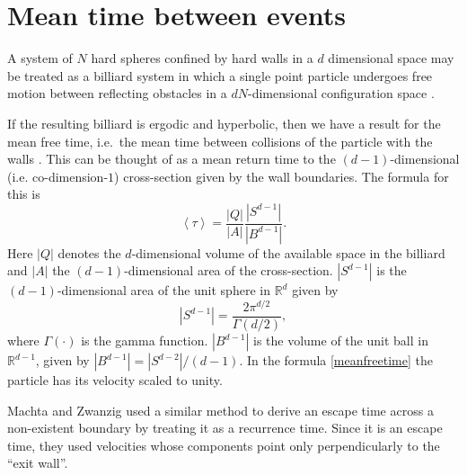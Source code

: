 \documentclass[a4paper,10pt, jcp, aps, preprint]{revtex4-1}
\newcommand{\mean}[1]{\left \langle #1 \right \rangle}
\newcommand{\RR}{\mathbb{R}}
\begin{document}
 

\section{Mean time between events}

A system of $N$ hard spheres confined by hard walls in a $d$ dimensional
space may be treated as a billiard system 
in which a single point  particle undergoes free motion between reflecting obstacles 
in a $ d N $-dimensional configuration space \cite{Sinai70, MarkChern}. 

If the resulting billiard is ergodic and hyperbolic, then we
have a result for the mean free time, i.e.\ the mean time between 
collisions of the particle with the walls \cite{MarkChern}. 
This can be thought of as a mean return time to the $(d-1)$-dimensional 
(i.e. co-dimension-$1$) cross-section given by the wall boundaries.
The formula for this is
\begin{equation}\label{meanfreetime}
 \mean{\tau} = \frac{|Q|}{|A|} \frac{|S^{d-1}|}{|B^{d-1}|}.
\end{equation}
Here $|Q|$ denotes the $d$-dimensional volume of the available 
space in the billiard and 
$|A|$ the $(d-1)$-dimensional area of the cross-section.
 $|S^{d-1}|$ is the $(d-1)$-dimensional area of the unit sphere in $\RR^d$ given by
\begin{equation}
  |S^{d-1}| = \frac{2 \pi^{d/2}}{\Gamma(d/2)},
\end{equation}
where $\Gamma(\cdot)$ is the gamma function. 
$|B^{d-1}|$ is the volume of the unit ball 
in $\RR^{d-1}$, given by $|B^{d-1}| = |S^{d-2}| / (d-1)$.
In the formula \ref{meanfreetime}  the particle has 
its velocity scaled to unity.

Machta and Zwanzig \cite{MachtaZwan} used a similar method to derive an escape 
time across a non-existent boundary by treating it as a recurrence time.
Since it is an escape time, they used velocities whose components point only 
perpendicularly to the ``exit wall''.
\end{document}

